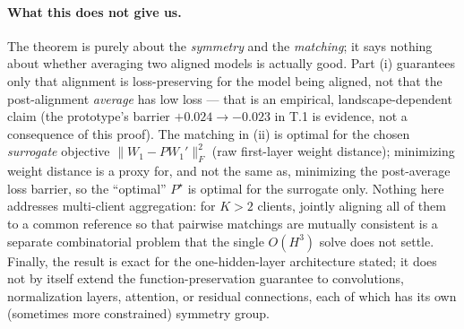 \documentclass[11pt]{article}
\theoremstyle{definition}
\theoremstyle{remark}
\begin{document}
\paragraph{What this does not give us.}
The theorem is purely about the \emph{symmetry} and the \emph{matching}; it says nothing about
whether averaging two aligned models is actually good. Part (i) guarantees only that alignment is
loss-preserving for the model being aligned, not that the post-alignment \emph{average} has low loss
--- that is an empirical, landscape-dependent claim (the prototype's barrier $+0.024\to-0.023$ in
T.1 is evidence, not a consequence of this proof). The matching in (ii) is optimal for the chosen
\emph{surrogate} objective $\lVert W_1 - PW_1'\rVert_F^2$ (raw first-layer weight distance); minimizing
weight distance is a proxy for, and not the same as, minimizing the post-average loss barrier, so the
``optimal'' $P^{\star}$ is optimal for the surrogate only. Nothing here addresses multi-client
aggregation: for $K>2$ clients, jointly aligning all of them to a common reference so that pairwise
matchings are mutually consistent is a separate combinatorial problem that the single $O(H^3)$
solve does not settle. Finally, the result is exact for the one-hidden-layer architecture stated; it
does not by itself extend the function-preservation guarantee to convolutions, normalization layers,
attention, or residual connections, each of which has its own (sometimes more constrained) symmetry
group.
\end{document}
